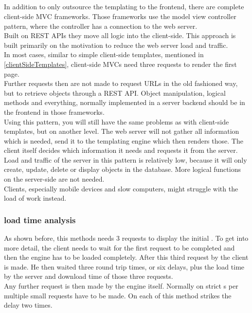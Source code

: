 \subsection{\ClientSideMVC{}\label{clientSideMVC}}
In addition to only outsource the templating to the frontend, there are complete client-side MVC frameworks.
Those frameworks use the model view controller pattern, where the controller has a connection to the web server.
\\
Built on REST APIs they move all logic into the client-side.
This approach is built primarily on the motivation to reduce the web server load and traffic.
\\
In most cases, similar to simple client-side templates, mentioned in \ref{clientSideTemplates}, client-side MVCs need three requests to render the first page.
\\
Further requests then are not made to request URLs in the old fashioned way, but to retrieve objects through a REST API. 
Object manipulation, logical methods and everything, normally implemented in a server backend should be in the frontend in those frameworks.
\\
Using this pattern, you will still have the same problems as with client-side templates, but on another level.
The web server will not gather all information which is needed, send it to the templating engine which then renders those.
The client itself decides which information it needs and requests it from the server.
\\
Load and traffic of the server in this pattern is relatively low, because it will only create, update, delete or display objects in the database. 
More logical functions on the server-side are not needed.
\\
Clients, especially mobile devices and slow computers, might struggle with the load of work instead.

\subsubsection{load time analysis}
As shown before, this methods needs 3 requests to display the initial \webPage{}.
To get into more detail, the client needs to wait for the first request to be completed and then the \ajax{} engine has to be loaded completely.
After this third request by the client is made.
He then waited three round trip times, or six delays, plus the load time by the server and download time of those three requests.
\\
Any further request is then made by the \ajax{} engine itself.
Normally on strict \clientSideMVC{}s per \webPage{} multiple small requests have to be made.
On each of this method strikes the delay two times.
 

